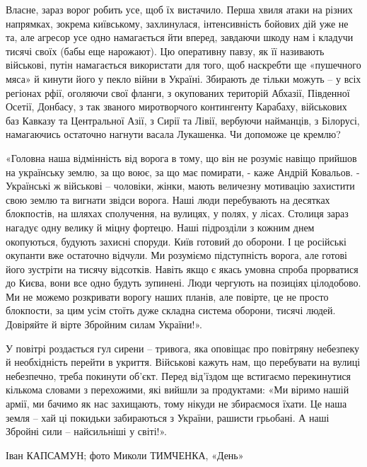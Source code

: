 
Власне, зараз ворог робить усе, щоб їх вистачило. Перша хвиля атаки на різних
напрямках, зокрема київському, захлинулася, інтенсивність бойових дій уже не
та, але агресор усе одно намагається йти вперед, завдаючи шкоду нам і кладучи
тисячі своїх (бабы еще нарожают). Цю оперативну павзу, як її називають
військові, путін намагається використати для того, щоб наскребти ще «пушечного
мяса» й кинути його у пекло війни в Україні. Збирають де тільки можуть – у всіх
регіонах рфії, оголяючи свої фланги, з окупованих територій Абхазії, Південної
Осетії, Донбасу, з так званого миротворчого контингенту Карабаху, військових
баз Кавказу та Центральної Азії, з Сирії та Лівії, вербуючи найманців, з
Білорусі, намагаючись остаточно нагнути васала Лукашенка. Чи допоможе це
кремлю?


«Головна наша відмінність від ворога в тому, що він не розуміє навіщо прийшов
на українську землю, за що воює, за що має помирати, - каже Андрій Ковальов. -
Українські ж військові – чоловіки, жінки, мають величезну мотивацію захистити
свою землю та вигнати звідси ворога. Наші люди перебувають на десятках
блокпостів, на шляхах сполучення, на вулицях, у полях, у лісах. Столиця зараз
нагадує одну велику й міцну фортецю. Наші підрозділи з кожним днем окопуються,
будують захисні споруди. Київ готовий до оборони. І це російські окупанти вже
остаточно відчули. Ми розуміємо підступність ворога, але готові його зустріти
на тисячу відсотків. Навіть якщо є якась умовна спроба прорватися до Києва,
вони все одно будуть зупинені. Люди чергують на позиціях цілодобово. Ми не
можемо розкривати ворогу наших планів, але повірте, це не просто блокпости, за
цим усім стоїть дуже складна система оборони, тисячі людей. Довіряйте й вірте
Збройним силам України!».


У повітрі роздається гул сирени – тривога, яка оповіщає про повітряну небезпеку
й необхідність перейти в укриття. Військові кажуть нам, що перебувати на вулиці
небезпечно, треба покинути об'єкт. Перед від'їздом ще встигаємо перекинутися
кількома словами з перехожими, які вийшли за продуктами: «Ми віримо нашій
армії, ми бачимо як нас захищають, тому нікуди не збираємося їхати. Це наша
земля – хай ці покидьки забираються з України, рашисти грьобані. А наші Збройні
сили – найсильніші у світі!».  

Іван КАПСАМУН; фото Миколи ТИМЧЕНКА, «День»

